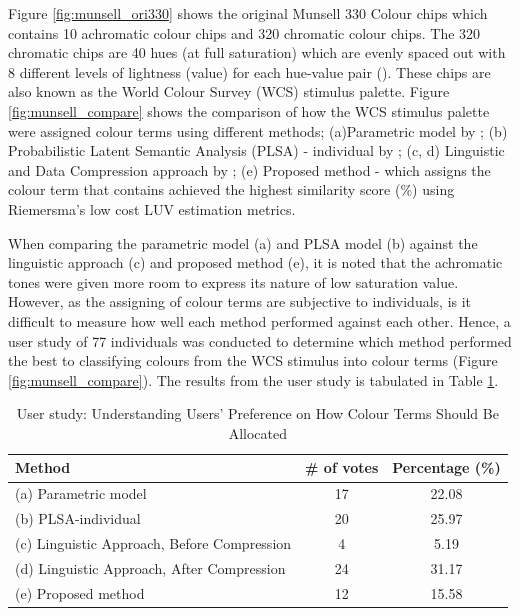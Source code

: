 Figure \ref{fig:munsell_ori330} shows the original Munsell 330 Colour chips which contains 10 achromatic colour chips and 320 chromatic colour chips.
The 320 chromatic chips are 40 hues (at full saturation) which are evenly spaced out with 8 different levels of lightness (value) for each hue-value pair (\cite{kay2009world}).
These chips are also known as the World Colour Survey (WCS) stimulus palette.
Figure \ref{fig:munsell_compare} shows the comparison of how the WCS stimulus palette were assigned colour terms using different methods; (a)Parametric model by ; (b) Probabilistic Latent Semantic Analysis (PLSA) - individual by ; (c, d) Linguistic and Data Compression approach by ; (e) Proposed method - which assigns the colour term that contains achieved the highest similarity score (\%) using Riemersma's low cost LUV estimation metrics.

When comparing the parametric model (a) and PLSA model (b) against the linguistic approach (c) and proposed method (e), it is noted that the achromatic tones were given more room to express its nature of low saturation value. However, as the assigning of colour terms are subjective to individuals, is it difficult to measure how well each method performed against each other. Hence, a user study of 77 individuals was conducted to determine which method performed the best to classifying colours from the WCS stimulus into colour terms (Figure \ref{fig:munsell_compare}). The results from the user study is tabulated in Table \ref{tab:munsell_result}.

\begin{table}[H]\centering
\begin{tabular}{|l|c|c|}
\hline
\textbf{Method}                             & \textbf{\# of votes} & \textbf{Percentage (\%)} \\ \hline
(a) Parametric model                        & 17                   & 22.08              \\ \hline
(b) PLSA-individual                         & 20                   & 25.97              \\ \hline
(c) Linguistic Approach, Before Compression & 4                    & 5.19              \\ \hline
(d) Linguistic Approach, After Compression  & 24                   & 31.17              \\ \hline
(e) Proposed method                         & 12                   & 15.58              \\ \hline
\end{tabular}
\caption{User study: Understanding Users' Preference on How Colour Terms Should Be Allocated}
\label{tab:munsell_result}
\end{table}

